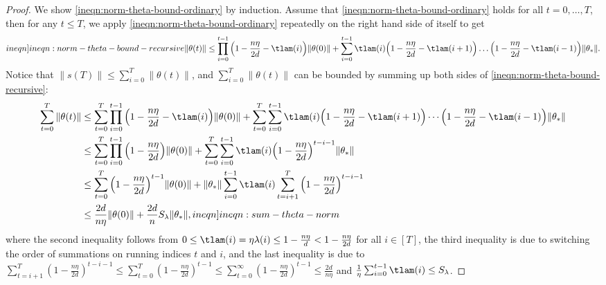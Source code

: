 \begin{proof}
    We show \cref{ineqn:norm-theta-bound-ordinary} by induction. Assume that \eqref{ineqn:norm-theta-bound-ordinary} holds for all $t=0,\ldots,T$, then for any $t\leq T$, we apply \cref{ineqn:norm-theta-bound-ordinary} repeatedly on the right hand side of itself to get
\begin{align}\label[ineqn]{ineqn:norm-theta-bound-recursive}
    \|\theta(t)\|\leq \prod_{i=0}^{t-1}\Big(1-\frac{n\eta}{2d}-\tlam(i)\Big)\|\theta(0)\| + \sum_{i=0}^{t-1}\tlam(i)\Big(1-\frac{n\eta}{2d}-\tlam(i+1)\Big)\dots \Big(1-\frac{n\eta}{2d}-\tlam(i-1)\Big)\|\theta_\ast\|.
\end{align}
Notice that $\|s(T)\| \leq \sum_{i=0}^T \|\theta(t)\|$, and $\sum_{i=0}^T \|\theta(t)\|$ can be bounded by summing up both sides of \cref{ineqn:norm-theta-bound-recursive}:
\begin{align}
    \sum_{t=0}^T \|\theta(t)\|
    &\leq  \sum_{t=0}^T\prod_{i=0}^{t-1}\Big(1-\frac{n\eta}{2d}-\tlam(i)\Big)\|\theta(0)\| + \sum_{t=0}^T\sum_{i=0}^{t-1}\tlam(i)\Big(1-\frac{n\eta}{2d}-\tlam(i+1)\Big) \cdots \Big(1-\frac{n\eta}{2d}-\tlam(i-1)\Big)\|\theta_\ast\| \nonumber \\
    &\leq \sum_{t=0}^T\prod_{i=0}^{t-1}\Big(1-\frac{n\eta}{2d}\Big)\|\theta(0)\|+\sum_{t=0}^T\sum_{i=0}^{t-1}\tlam(i)\Big(1-\frac{n\eta}{2d}\Big)^{t-i-1}\|\theta_\ast\| \nonumber \\
    &\leq \sum_{t=0}^T\Big(1-\frac{n\eta}{2d}\Big)^{t-1}\|\theta(0)\| + \|\theta_\ast\|\sum_{i=0}^{t-1}\tlam(i)\sum_{t=i+1}^T \Big(1-\frac{n\eta}{2d}\Big)^{t-i-1} \nonumber \\
    &\leq \frac{2d}{n\eta}\|\theta(0)\| + \frac{2d}{n} S_\lambda\|\theta_\ast\|, \label[ineqn]{ineqn:sum-theta-norm}
\end{align}
where the second inequality follows from $0\leq \tlam(i) = \eta\lambda(i) \leq 1-\frac{n\eta}{d} < 1-\frac{n\eta}{2d}$ for all $i\in[T]$, the third inequality is due to switching the order of summations on running indices $t$ and $i$, and the last inequality is due to $\sum_{t=i+1}^T (1-\frac{n\eta}{2d})^{t-i-1} \leq \sum_{t=0}^T(1-\frac{n\eta}{2d})^{t-1} \leq \sum_{t=0}^\infty (1-\frac{n\eta}{2d})^{t-1} \leq \frac{2d}{n\eta}$ and $\frac{1}{\eta}\sum_{i=0}^{t-1}\tlam(i) \leq S_\lambda$.


\end{proof}
